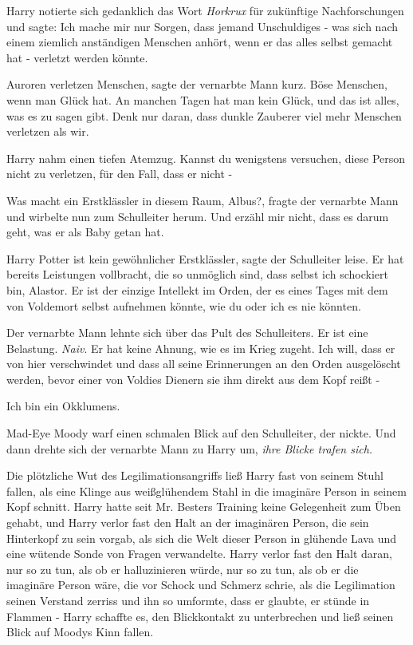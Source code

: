 Harry notierte sich gedanklich das Wort \emph{Horkrux} für zukünftige
Nachforschungen und sagte: \glqq{}Ich mache mir nur Sorgen, dass jemand
Unschuldiges - was sich nach einem ziemlich anständigen Menschen anhört, wenn er
das alles selbst gemacht hat - verletzt werden könnte.\grqq{}

\glqq{}Auroren verletzen Menschen\grqq{}, sagte der vernarbte Mann kurz. \glqq{}
Böse Menschen, wenn man Glück hat. An manchen Tagen hat man kein Glück, und das
ist alles, was es zu sagen gibt. Denk nur daran, dass dunkle Zauberer viel mehr
Menschen verletzen als wir.\grqq{}

Harry nahm einen tiefen Atemzug. \glqq{}Kannst du wenigstens versuchen, diese
Person nicht zu verletzen, für den Fall, dass er nicht -\grqq{}

\glqq{}Was macht ein Erstklässler in diesem Raum, Albus?\grqq{}, fragte der
vernarbte Mann und wirbelte nun zum Schulleiter herum. \glqq{}Und erzähl mir
nicht, dass es darum geht, was er als Baby getan hat.\grqq{}

\glqq{}Harry Potter ist kein gewöhnlicher Erstklässler\grqq{}, sagte der
Schulleiter leise. \glqq{}Er hat bereits Leistungen vollbracht, die so unmöglich
sind, dass selbst ich schockiert bin, Alastor. Er ist der einzige Intellekt im
Orden, der es eines Tages mit dem von Voldemort selbst aufnehmen könnte, wie du
oder ich es nie könnten.\grqq{}

Der vernarbte Mann lehnte sich über das Pult des Schulleiters. \glqq{}Er ist eine
Belastung. \emph{Naiv}. Er hat keine Ahnung, wie es im Krieg zugeht. Ich will,
dass er von hier verschwindet und dass all seine Erinnerungen an den Orden
ausgelöscht werden, bevor einer von Voldies Dienern sie ihm direkt aus dem Kopf
reißt -\grqq{}

\glqq{}Ich bin ein Okklumens.\grqq{}

Mad-Eye Moody warf einen schmalen Blick auf den Schulleiter, der nickte. Und
dann drehte sich der vernarbte Mann zu Harry um,\emph{ ihre Blicke trafen sich.
}

Die plötzliche Wut des Legilimationsangriffs ließ Harry fast von seinem Stuhl
fallen, als eine Klinge aus weißglühendem Stahl in die imaginäre Person in
seinem Kopf schnitt. Harry hatte seit Mr. Besters Training keine Gelegenheit zum
Üben gehabt, und Harry verlor fast den Halt an der imaginären Person, die sein
Hinterkopf zu sein vorgab, als sich die Welt dieser Person in glühende Lava und
eine wütende Sonde von Fragen verwandelte. Harry verlor fast den Halt daran, nur
so zu tun, als ob er halluzinieren würde, nur so zu tun, als ob er die imaginäre
Person wäre, die vor Schock und Schmerz schrie, als die Legilimation seinen
Verstand zerriss und ihn so umformte, dass er glaubte, er stünde in Flammen -
Harry schaffte es, den Blickkontakt zu unterbrechen und ließ seinen Blick auf
Moodys Kinn fallen.

